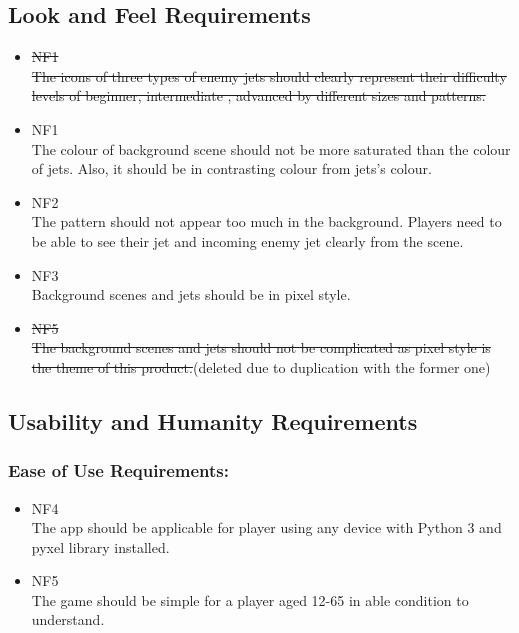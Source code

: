 \documentclass[12pt, titlepage]{article}
\begin{document}
\subsection{Look and Feel Requirements}
\begin{itemize}
    \item \sout{NF1}\\
    \sout{The icons of three types of enemy jets should clearly represent their difficulty levels of beginner, intermediate , advanced by different sizes and patterns.}
		
	\item NF{\color{red}1}\\
	The colour of background scene should not be more saturated than the colour of jets. Also, it should be in contrasting colour from jets’s colour.
		
	\item NF{\color{red}2}\\
	The pattern should not appear too much in the background. Players need to be able to see their jet and incoming enemy jet clearly from the scene.
		
	\item NF{\color{red}3}\\
	Background scenes and jets should be in pixel style.
		
	\item \sout{NF5}\\
	\sout{The background scenes and jets should not be complicated as pixel style is the theme of this product.}(deleted due to duplication with the former one)

\end{itemize}
\subsection{Usability and Humanity Requirements}
\subsubsection{Ease of Use Requirements:}
\begin{itemize}
	\item NF{\color{red}4}\\
	The app should be applicable for player {\color{red}using any device with Python 3 and pyxel library installed.}
    \item NF{\color{red}5}\\
    The game should be simple for a player aged 12-65 in able condition to understand.
\end{itemize}
\end{document}
